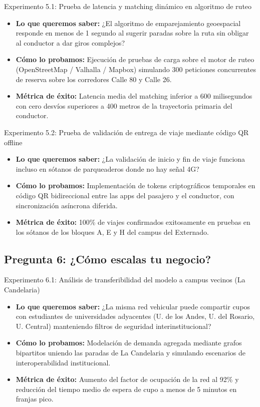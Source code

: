 \documentclass[11pt,a4paper]{article}
\begin{document}
\begin{kbibox}{Experimento 5.1: Prueba de latencia y matching dinámico en algoritmo de ruteo}
\begin{itemize}[leftmargin=*]
    \item \textbf{Lo que queremos saber:} ¿El algoritmo de emparejamiento geoespacial responde en menos de 1 segundo al sugerir paradas sobre la ruta sin obligar al conductor a dar giros complejos?
    \item \textbf{Cómo lo probamos:} Ejecución de pruebas de carga sobre el motor de ruteo (OpenStreetMap / Valhalla / Mapbox) simulando 300 peticiones concurrentes de reserva sobre los corredores Calle 80 y Calle 26.
    \item \textbf{Métrica de éxito:} Latencia media del matching inferior a 600 milisegundos con cero desvíos superiores a 400 metros de la trayectoria primaria del conductor.
\end{itemize}
\end{kbibox}

\begin{kbibox}{Experimento 5.2: Prueba de validación de entrega de viaje mediante código QR offline}
\begin{itemize}[leftmargin=*]
    \item \textbf{Lo que queremos saber:} ¿La validación de inicio y fin de viaje funciona incluso en sótanos de parqueaderos donde no hay señal 4G?
    \item \textbf{Cómo lo probamos:} Implementación de tokens criptográficos temporales en código QR bidireccional entre las apps del pasajero y el conductor, con sincronización asíncrona diferida.
    \item \textbf{Métrica de éxito:} 100\% de viajes confirmados exitosamente en pruebas en los sótanos de los bloques A, E y H del campus del Externado.
\end{itemize}
\end{kbibox}

\subsection{Pregunta 6: ¿Cómo escalas tu negocio?}

\begin{kbibox}{Experimento 6.1: Análisis de transferibilidad del modelo a campus vecinos (La Candelaria)}
\begin{itemize}[leftmargin=*]
    \item \textbf{Lo que queremos saber:} ¿La misma red vehicular puede compartir cupos con estudiantes de universidades adyacentes (U. de los Andes, U. del Rosario, U. Central) manteniendo filtros de seguridad interinstitucional?
    \item \textbf{Cómo lo probamos:} Modelación de demanda agregada mediante grafos bipartitos uniendo las paradas de La Candelaria y simulando escenarios de interoperabilidad institucional.
    \item \textbf{Métrica de éxito:} Aumento del factor de ocupación de la red al 92\% y reducción del tiempo medio de espera de cupo a menos de 5 minutos en franjas pico.
\end{itemize}
\end{kbibox}
\end{document}

